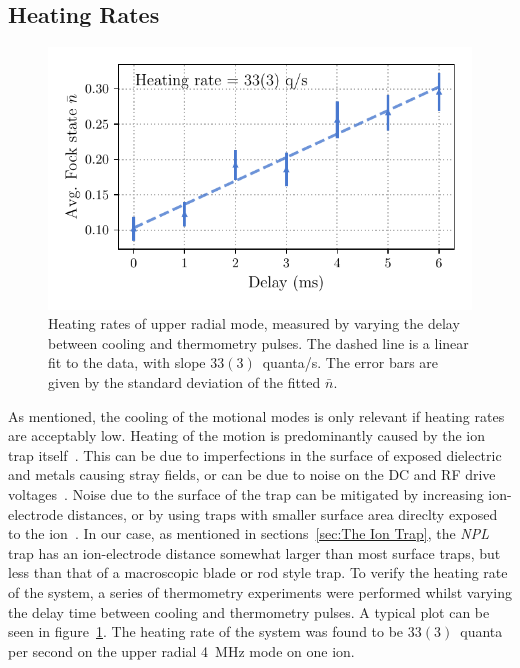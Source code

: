 \subsection{Heating Rates}
\label{sec:Heating}

    \begin{figure}
        \begin{center}
        \noindent\includegraphics[width=0.75\linewidth]{
            figures/pdf_figure/heating_rate.pdf
            }
        \end{center}
        \caption{
            Heating rates of upper radial mode, measured by varying the delay between cooling and thermometry pulses. The dashed line is a linear fit to the data, with slope $33(3)$~quanta/s. The error bars are given by the standard deviation of the fitted $\bar{n}$.
            }
        \label{fig:heating rates}
    \end{figure}

    As mentioned, the cooling of the motional modes is only relevant if heating rates are acceptably low. Heating of the motion is predominantly caused by the ion trap
    itself~\cite{}. This can be due to imperfections in the surface of exposed
    dielectric and metals causing stray fields, or can be due to noise on the DC
    and RF drive voltages~\cite{}. Noise due to the surface of the trap can be
    mitigated by increasing ion-electrode distances, or by using traps with
    smaller surface area direclty exposed to the ion~\cite{}. In our case, as mentioned
    in sections~\ref{sec:The Ion Trap}, the \emph{NPL} trap has an ion-electrode 
    distance somewhat larger than most surface traps, but less than that of a
    macroscopic blade or rod style trap. To verify the heating rate of the
    system, a series of thermometry experiments were performed whilst varying the delay
    time between cooling and thermometry pulses. A typical plot can be seen in
    figure~\ref{fig:heating rates}. The heating rate of the system
    was found to be $33(3)$~quanta per second on the upper radial 4~\unit{\MHz} mode on
    one ion.\\
    
